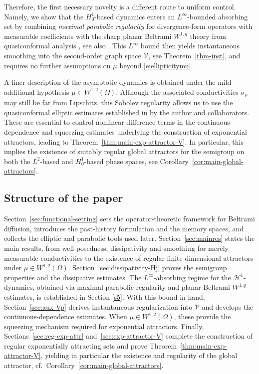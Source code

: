 \documentclass[12pt,leqno]{amsart}
\theoremstyle{definition}
\numberwithin{equation}{section}
\numberwithin{figure}{section}
\begin{document}
Therefore, the first necessary novelty is   a different route to uniform control. Namely, we show that the
$H^1_0$-based dynamics enters an $L^\infty$-bounded absorbing set by combining \emph{maximal parabolic regularity}
for divergence-form operators with measurable coefficients \cites{HR,KunstmannWeis2004} with the sharp planar
Beltrami $W^{1,q}$ theory from quasiconformal analysis \cite{AIM}, see also \cite{DPF}.
This $L^\infty$ bound then yields instantaneous smoothing into the second-order graph space $\mathcal V$,
see Theorem~\ref{thm-inst}, and requires no further assumptions on $\mu$ beyond \eqref{e:ellipticitymu}.

A finer description of the asymptotic dynamics is obtained under the mild additional hypothesis
$\mu\in W^{1,2}(\Omega)$. Although the associated conductivities $\sigma_\mu$ may still be far from Lipschitz,
this Sobolev regularity allows us to use the quasiconformal elliptic estimates established in \cite{DPF} by the author and collaborators.
These are essential to control nonlinear difference terms in the continuous-dependence and squeezing
estimates underlying the construction of exponential attractors, leading to Theorem~\ref{thm:main-exp-attractor-V}.
In particular, this implies the existence of suitably regular global attractors for the semigroup on both the
$L^{2}$-based and $H^{1}_{0}$-based phase spaces,  see Corollary~\ref{cor:main-global-attractors}.
\label{Ss15}
\subsection{Structure of the paper}
Section~\ref{sec:functional-setting} sets the operator-theoretic framework for Beltrami diffusion, introduces
the past-history formulation and the memory spaces, and collects the elliptic and parabolic tools used later.
Section~\ref{sec:mainres} states the main results, from well-posedness,  dissipativity and smoothing for merely measurable
conductivities to the existence of regular finite-dimensional attractors under $\mu\in W^{1,2}(\Omega)$.
Section~\ref{sec:dissipativity-Hj} proves the semigroup properties and the dissipative estimates.
The $L^\infty$-absorbing regime for the $\mathcal H^{1}$-dynamics, obtained via maximal parabolic regularity and
planar Beltrami $W^{1,q}$ estimates, is established in Section \ref{s5}.
With this bound in hand, Section~\ref{sec:aux-Vp} derives instantaneous regularization into $\mathcal V$ and develops
the continuous-dependence estimates. When $\mu\in W^{1,2}(\Omega)$, these provide the squeezing mechanism required for
exponential attractors. Finally, Sections~\ref{sec:reg-exp-attr} and~\ref{sec:exp-attractor-V} complete the construction
of regular exponentially attracting sets and prove Theorem~\ref{thm:main-exp-attractor-V}, yielding in particular the
existence and regularity of the global attractor, cf.\ Corollary~\ref{cor:main-global-attractors}.
\end{document}
